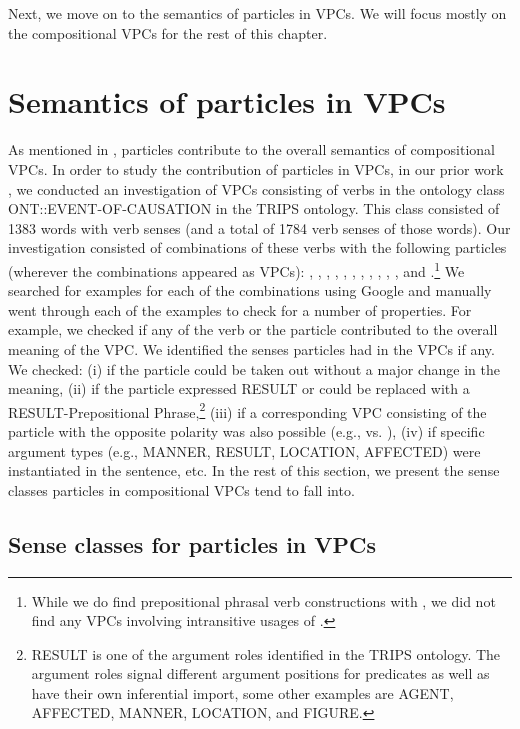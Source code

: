 \documentclass[output=paper,modfonts,nonflat]{langsci/langscibook}
\begin{document}
Next, we move on to the semantics of particles in VPCs. We will focus mostly on the compositional VPCs for the rest of this chapter. 

\section{Semantics of particles in VPCs} \label{sec:prtcl-semcs}

As mentioned in , particles contribute to the overall semantics of compositional VPCs. In order to study the contribution of particles in VPCs, in our prior work \citep{Bha17}, we conducted an investigation of VPCs consisting of verbs in the ontology class ONT::EVENT-OF-CAUSATION in the TRIPS ontology. This class consisted of 1383 words with verb senses (and a total of 1784 verb senses of those words). Our investigation consisted of combinations of these verbs with the following particles (wherever the combinations %
appeared as VPCs): , , , , , , , , , , , and .\footnote{While we do find prepositional phrasal verb constructions with , we did not find any VPCs involving intransitive usages of .} We searched for examples for each of the combinations using Google and manually went through each of the examples to check for a number of properties. For example, we checked if any of the verb or the particle contributed to the overall meaning of the VPC. We identified the senses particles had in the VPCs if any. We checked: (i) if the particle could be taken out without a major change in the meaning, (ii) if the particle expressed RESULT or could be replaced with a RESULT-Prepositional Phrase,\footnote{RESULT is one of the argument roles identified in the TRIPS ontology. The argument roles signal different argument positions for predicates as well as have their own inferential import, some other examples are AGENT, AFFECTED, MANNER, LOCATION, and FIGURE.} (iii) if a corresponding VPC consisting of the particle with the opposite polarity was also possible (e.g.,  vs. ), (iv) if specific argument types (e.g., MANNER, RESULT, LOCATION, AFFECTED) were instantiated in the sentence, etc. In the rest of this section, we present the sense classes particles in compositional VPCs tend to fall into. 

\subsection{Sense classes for particles in VPCs} \label{sec:senses}
\end{document}
